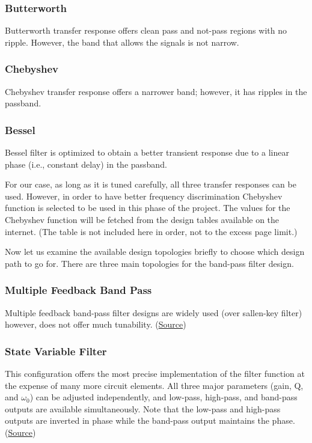 \documentclass[letterpaper,12pt]{article}
\begin{document}
\subsubsection{Butterworth}
Butterworth transfer response offers clean pass and not-pass regions with no ripple. However, the band that allows the signals is not narrow.
\vspace{-4mm}
\subsubsection{Chebyshev}
Chebyshev transfer response offers a narrower band; however, it has ripples in the passband.
\subsubsection{Bessel}
Bessel filter is optimized to obtain a better transient response due to a linear phase (i.e., constant delay) in the passband.

\vspace{2mm}
For our case, as long as it is tuned carefully, all three transfer responses can be used. However, in order to have better frequency discrimination Chebyshev function is selected to be used in this phase of the project. The values for the Chebyshev function will be fetched from the design tables available on the internet. (The table is not included here in order, not to the excess page limit.)

\vspace{2mm}
Now let us examine the available design topologies briefly to choose which design path to go for. There are three main topologies for the band-pass filter design.
\vspace{-4mm}
\subsubsection{Multiple Feedback Band Pass}
Multiple feedback band-pass filter designs are widely used (over sallen-key filter) however, does not offer much tunability. (\href{https://www.analog.com/media/en/training-seminars/tutorials/mt-220.pdf}{Source})
\vspace{-4mm}
\subsubsection{State Variable Filter}


This configuration offers the most precise implementation of the filter function at the expense of many more circuit elements. All three major parameters (gain, Q, and \(\omega_0\)) can be adjusted independently, and low-pass, high-pass, and band-pass outputs are available simultaneously. Note that the low-pass and high-pass outputs are inverted in phase while the band-pass output maintains the phase. (\href{https://www.analog.com/media/en/training-seminars/tutorials/MT-223.pdf}{Source})
\vspace{-4mm}
\end{document}
